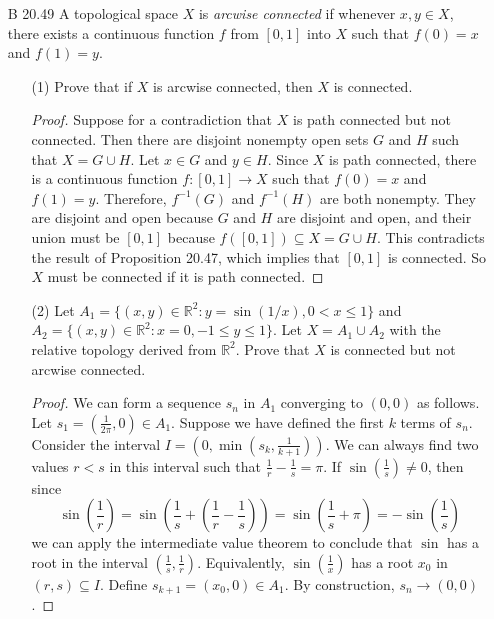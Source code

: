 \documentclass[10pt]{article}
\newcommand{\R}{\mathbb{R}}
\newcommand{\U}{\mathcal{U}}
\begin{document}
\begin{enumerate}
\begin{proof}
Finally, let $x,y \in Y$ be distinct.  Then there is an open neighborhood $\U$ of $x$ in $X$ such that $y \not \in \U$.  So $\U \cap Y$ is an open neighborhood of $x$ in $Y$ with $y \not \in \U \cap Y$.  So $Y$ is normal.
\end{proof}

\item[B 20.49] A topological space $X$ is \emph{arcwise connected} if whenever $x,y \in X$, there exists a continuous function $f$ from $[0,1]$ into $X$ such that $f(0) = x$ and $f(1) = y$.
\begin{enumerate}
\item[(1)] Prove that if $X$ is arcwise connected, then $X$ is connected.

\begin{proof}
Suppose for a contradiction that $X$ is path connected but not connected.  Then there are disjoint nonempty open sets $G$ and $H$ such that $X = G \cup H$.  Let $x \in G$ and $y \in H$.  Since $X$ is path connected, there is a continuous function $f: [0,1] \rightarrow X$ such that $f(0) = x$ and $f(1) = y$.  Therefore, $f^{-1}(G)$ and $f^{-1}(H)$ are both nonempty.  They are disjoint and open because $G$ and $H$ are disjoint and open, and their union must be $[0,1]$ because $f([0,1]) \subseteq X = G \cup H$.  This contradicts the result of Proposition 20.47, which implies that $[0,1]$ is connected.  So $X$ must be connected if it is path connected.
\end{proof}

\item[(2)] Let $A_1 = \{(x,y) \in \R^2 : y = \sin(1/x), 0 < x \leq 1\}$ and $A_2 = \{(x,y) \in \R^2 : x = 0, -1 \leq y \leq 1\}$.  Let $X = A_1 \cup A_2$ with the relative topology derived from $\R^2$.  Prove that $X$ is connected but not arcwise connected.

\begin{proof}
We can form a sequence $s_n$ in $A_1$ converging to $(0,0)$ as follows.  Let $s_1 = (\frac{1}{2\pi}, 0) \in A_1$.  Suppose we have defined the first $k$ terms of $s_n$.  Consider the interval $I = (0,\min(s_k,\frac{1}{k+1}))$.  We can always find two values $r < s$ in this interval such that $\frac1r - \frac1s = \pi$.  If $\sin(\frac{1}{s}) \neq 0$, then since
$$\sin\left(\frac{1}{r}\right) = \sin\left(\frac1s + \left(\frac{1}{r} - \frac1s\right)\right) = \sin\left(\frac1s + \pi\right)  = -\sin\left(\frac1s\right)$$
we can apply the intermediate value theorem to conclude that $\sin$ has a root in the interval $(\frac{1}{s}, \frac{1}{r})$.  Equivalently, $\sin(\frac1x)$ has a root $x_0$ in $(r,s) \subseteq I$.  Define $s_{k+1} = (x_0,0) \in A_1$.  By construction, $s_n \rightarrow (0,0)$.


\end{proof}
\end{enumerate}
\end{enumerate}
\end{document}
